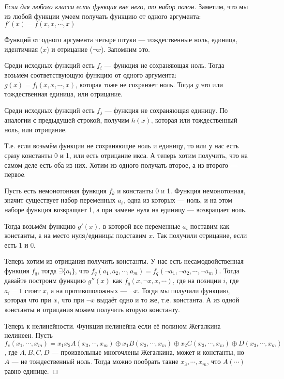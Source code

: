 \begin{proof}[Если для любого класса есть функция вне него, то набор полон]
	Заметим, что мы из любой функции умеем получать функцию от одного аргумента: $f'(x) = f(x, x, \cdots, x)$

	Функций от одного аргумента четыре штуки --- тождественные ноль, единица, идентичная ($x$) и отрицание ($\lnot x$). Запомним это.
	
	Среди исходных функций есть $f_i$ --- функция не сохраняющая ноль. Тогда возьмём соответствующую функцию от одного аргумента: $g(x) = f_i(x, x, \cdots, x)$, которая тоже не сохраняет ноль. Тогда $g$ это или тождественная единица, или отрицание.

	Среди исходных функций есть $f_j$ --- функция не сохраняющая единицу. По аналогии с предыдущей строкой, получим $h(x)$, которая или тождественный ноль, или отрицание.

	Т.е. если возьмём функции не сохраняющие ноль и единицу, то или у нас есть сразу константы 0 и 1, или есть отрицание икса. А теперь хотим получить, что на самом деле есть оба из них. Хотим из одного получать второе, а из второго --- первое.

	Пусть есть немонотонная функция $f_k$ и константы 0 и 1. Функция немонотонная, значит существует набор переменных $a_i$, одна из которых ---  ноль, и на этом наборе функция возвращает 1, а при замене нуля на единицу --- возвращает ноль. 

	Тогда возьмём функцию $g'(x)$, в которой все переменные $a_i$ поставим как константы, а на место нуля/единицы подставим $x$. Так получили отрицание, если есть $1$ и $0$.

	Теперь хотим из отрицания получить константы. У нас есть несамодвойственная функция $f_q$, тогда $\exists \{a_i\}$, что $f_q(a_1, a_2, \cdots, a_m) = f_q(\lnot a_1, \lnot a_2, \cdots, \lnot a_m)$. Тогда давайте построим функцию $g''(x)$ как $f_q(x, \lnot x, x, \cdots)$, где на позиции $i$, где $a_i = 1$ стоит $x$, а на противоположных --- $\lnot x$. Тогда мы получили функцию, которая что при $x$, что при $\lnot x$ выдаёт одно и то же, т.е. константа. А из одной константы и отрицания можем получить вторую константу.

	Теперь к нелинейности. Функция нелинейна если её полином Жегалкина нелинеен. Пусть $f_e(x_1, \cdots, x_m) = x_1 x_2 A(x_3, \cdots, x_m) \oplus x_1 B(x_3, \cdots, x_m) \oplus x_2 C(x_3, \cdots, x_m) \oplus D(x_3, \cdots, x_m) $, где $A, B, C, D$ --- произвольные многочлены Жегалкина, может и константы, но $A$ --- не тождественный ноль. Тогда можно пообрать такие $x_3, \cdots, x_m$, что $A(\cdots)$ равно единице.


\end{proof}
